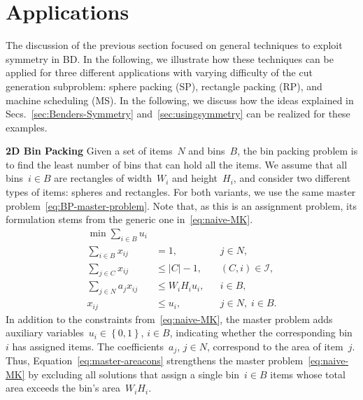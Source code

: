 \documentclass[a4paper,10pt]{article}
\newcommand{\rectanglepack}{RP\xspace}
\newcommand{\spherepack}{SP\xspace}
\newcommand{\scheduling}{MS\xspace}
\newcommand{\brackets}[1]{\left\{ #1 \right\}}
\theoremstyle{definition}
\begin{document}
% 
% 

\section{Applications}\label{sec:Applications}
The discussion of the previous section focused on general techniques to exploit symmetry in BD.
In the following, we illustrate how these techniques can be applied for three different applications with varying difficulty of the cut generation subproblem:
sphere packing (\spherepack), rectangle packing (\rectanglepack), and machine scheduling (\scheduling).
In the following, we discuss how the ideas explained in Secs.~\ref{sec:Benders-Symmetry} and~\ref{sec:usingsymmetry} can be realized for these examples.

%
%

\medskip
\noindent\textbf{2D Bin Packing}
Given a set of items~$N$ and bins~$B$, the bin packing problem is to find the least number of bins that can hold all the items.
We assume that all bins~$i \in B$ are rectangles of width~$W_i$ and height~$H_i$, and consider two different types of items: spheres and rectangles.
For both variants, we use the same master problem~\eqref{eq:BP-master-problem}.
Note that, as this is an assignment problem, its formulation stems from the generic one in~\eqref{eq:naive-MK}.
%
\begin{subequations}
    \label{eq:BP-master-problem}
    \begin{align}
        \min \sum_{i\in B} u_i & &&\nonumber \\
        \sum_{i\in B} x_{ij} &= 1, && j\in N, \label{eq:master-coveringcons}\\
        \sum_{j\in C} x_{ij} &\leq |C| - 1, &&  (C, i)\in \mathcal{I}, \label{eq:master-benders-cut} \\
        \sum_{j \in N} a_j x_{ij} &\leq W_i H_i u_{i}, && i \in B, \label{eq:master-areacons} \\
        x_{ij} &\leq u_i, && j\in N,\;  i \in B. \label{eq:master-openbincons}
    \end{align}    
\end{subequations}
%
In addition to the constraints from~\eqref{eq:naive-MK}, the master problem adds auxiliary variables~$u_i\in \brackets{0, 1}$, $i \in B$, indicating whether the corresponding bin~$i$ has assigned items.
The coefficients~$a_j$, $j \in N$, correspond to the area of item~$j$.
Thus, Equation~\eqref{eq:master-areacons} strengthens the master problem~\eqref{eq:naive-MK} by excluding all solutions that assign a single bin~$i \in B$ items whose total area exceeds the bin's area~$W_iH_i$.
\end{document}
